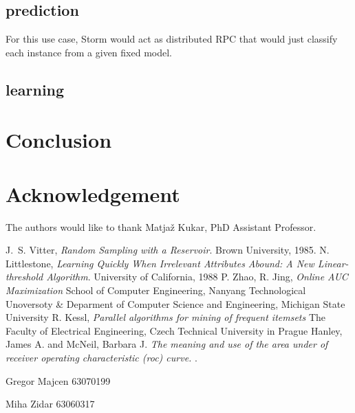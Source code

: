 \documentclass[journal]{IEEEtran/IEEEtran}
\begin{document}
\subsection{prediction}
For this use case, Storm would act as distributed RPC that would just classify each instance from a given fixed model. 

\subsection{learning}

\section{Conclusion}

\appendices

\section*{Acknowledgement}
The authors would like to thank Matjaž Kukar, PhD Assistant Professor.


\begin{thebibliography}{1}
J.~S. Vitter, \emph{Random Sampling with a Reservoir}. \relax Brown University, 1985.
N. Littlestone, \emph{Learning Quickly When Irrelevant Attributes
Abound: A New Linear-threshold Algorithm}. \relax University of California, 1988
P. Zhao, R. Jing, \emph{Online AUC Maximization} \relax School of Computer Engineering, Nanyang Technological Unoversoty \& Deparment of Computer Science and Engineering, Michigan State University
R. Kessl, \emph{Parallel algorithms for mining of frequent itemsets} \relax The Faculty of Electrical Engineering, Czech Technical University in Prague
Hanley, James A. and McNeil, Barbara J. \emph{The meaning and
use of the area under of receiver operating characteristic
(roc) curve.} .

\end{thebibliography}

\newpage

\begin{IEEEbiography}{Gregor Majcen}
63070199
\end{IEEEbiography}

\begin{IEEEbiography}{Miha Zidar}
63060317
\end{IEEEbiography}
\end{document}

